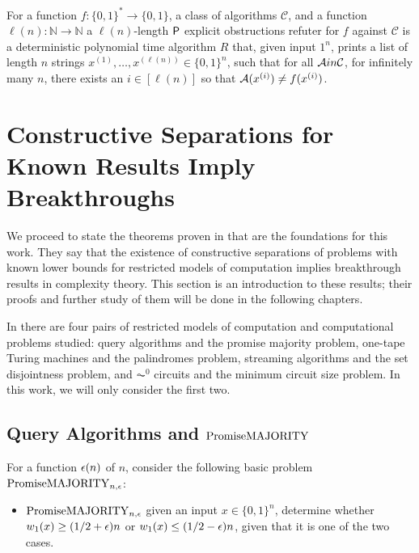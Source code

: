 \begin{definition}
	For a function $f \colon \{0, 1\}^* \to \{0, 1\}$, a class of algorithms $\mathcal{C}$,
	and a function $\ell(n) \colon \mathbb{N} \to \mathbb{N}$ 
	a $\ell(n)$-length $\mathsf{P}$ explicit obstructions refuter for $f$ against $\mathcal{C}$ is a deterministic polynomial time
	algorithm $R$ that, given input $1^n$, prints a list of length $n$ strings
	$x^{(1)}, \ldots, x^{(\ell(n))} \in \{0, 1\}^n$,
	such that for all $\mathcal{A} in \mathcal{C}$, for infinitely many $n$, there exists an $i \in [\ell(n)]$ so that 
	$\mathcal{A}(x^{(i)}) \neq f(x^{(i)})$.
\end{definition}



\section{Constructive Separations for Known Results Imply Breakthroughs}

We proceed to state the 
theorems proven in \cite{ConstructiveSeparations} that are the foundations 
for this work. They say that the existence of constructive separations of problems 
with known lower bounds for restricted models of computation implies breakthrough results in complexity theory. 
This section is an introduction to these results; their proofs and further study of them will be 
done in the following chapters. 

In \cite{ConstructiveSeparations} there are four pairs of restricted models of computation
and computational problems studied: query algorithms and the promise majority problem,
one-tape Turing machines and the palindromes problem, streaming algorithms and the set disjointness problem,
and $\AC^0$ circuits and the minimum circuit size problem. In this work, we will only consider the first two. 

\subsection{Query Algorithms and $\mathrm{PromiseMAJORITY}$}

For a function $\epsilon(n)$ of $n$, consider the following basic problem $\mathrm{PromiseMAJORITY}_{n, \epsilon}$:

\begin{itemize}
	\item[] $\mathrm{PromiseMAJORITY}_{n, \epsilon}$ given an input $x \in \{0, 1\}^n$, determine whether $w_1(x) \geq (1/2+\epsilon)n$
	or $w_1(x) \leq (1/2-\epsilon)n$, given that it is one of the two cases. 
\end{itemize}

